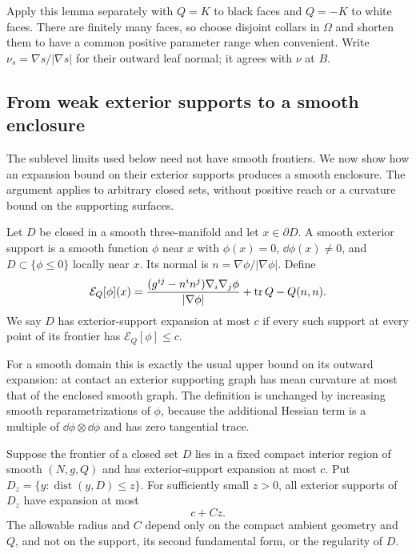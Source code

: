 Apply this lemma separately with $Q=K$ to black faces and $Q=-K$
to white faces.  There are finitely many faces, so choose disjoint
collars in $\Omega$ and shorten them to have a common positive
parameter range when convenient.  Write $\nu_s=\nabla s/|\nabla s|$
for their outward leaf normal; it agrees with $\nu$ at $B$.

\subsection{From weak exterior supports to a smooth enclosure}

The sublevel limits used below need not have smooth frontiers.  We now
show how an expansion bound on their exterior supports produces a smooth
enclosure.  The argument applies to arbitrary closed sets, without
positive reach or a curvature bound on the supporting surfaces.

\begin{definition}\label{n3:domains:support-definition}
Let $D$ be closed in a smooth three-manifold and let $x\in\partial D$.
A smooth exterior support is a smooth function $\phi$ near $x$ with
$\phi(x)=0$, $\dd\phi(x)\ne0$, and
$D\subset\{\phi\leq0\}$ locally near $x$.  Its normal is
$n=\nabla\phi/|\nabla\phi|$.  Define
\begin{equation}\label{n3:domains:test-expansion}
 \mathcal E_Q[\phi](x)
   =\frac{(g^{ij}-n^in^j)\nabla_i\nabla_j\phi}{|\nabla\phi|}
       +\operatorname{tr} Q-Q(n,n).
\end{equation}
We say $D$ has exterior-support expansion at most $c$ if every such
support at every point of its frontier has
$\mathcal E_Q[\phi]\leq c$.
\end{definition}

For a smooth domain this is exactly the usual upper bound on its
outward expansion: at contact an exterior supporting graph has mean
curvature at most that of the enclosed smooth graph.  The definition
is unchanged by increasing smooth reparametrizations of $\phi$,
because the additional Hessian term is a multiple of
$\dd\phi\otimes\dd\phi$ and has zero tangential trace.

\begin{lemma}
\label{n3:domains:parallel-support}
Suppose the frontier of a closed set $D$ lies in a fixed compact
interior region of smooth $(N,g,Q)$ and has exterior-support
expansion at most $c$.  Put
$D_z=\{y:\operatorname{dist}(y,D)\leq z\}$.  For sufficiently small
$z>0$, all exterior supports of $D_z$ have expansion at most
\begin{equation}\label{n3:domains:parallel-estimate}
 c+Cz.
\end{equation}
The allowable radius and $C$ depend only on the compact ambient
geometry and $Q$, and not on the support, its second fundamental
form, or the regularity of $D$.
\end{lemma}

